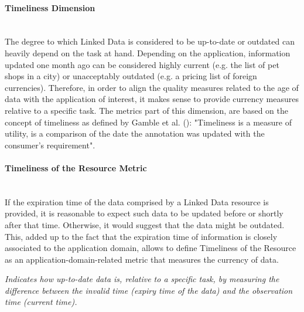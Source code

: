 

\paragraph{Timeliness Dimension}~\\ %
The degree to which Linked Data is considered to be up-to-date or outdated can heavily depend on the task at hand. Depending on the application, information updated one month ago can be considered highly current (e.g. the list of pet shops in a city) or unacceptably outdated (e.g. a pricing list of foreign currencies). Therefore, in order to align the quality measures related to the age of data with the application of interest, it makes sense to provide currency measures relative to a specific task. The metrics part of this dimension, are based on the concept of timeliness as defined by Gamble et al. (\cite{Gamble2011}): "Timeliness is a measure of utility, is a comparison of the date the annotation was updated with the consumer's requirement".

\paragraph{Timeliness of the Resource Metric} ~\\ %
If the expiration time of the data comprised by a Linked Data resource is provided, it is reasonable to expect such data to be updated before or shortly after that time. Otherwise, it would suggest that the data might be outdated. This, added up to the fact that the expiration time of information is closely associated to the application domain, allows to define Timeliness of the Resource as an application-domain-related metric that measures the currency of data.
\begin{mdframed}[style=metricdefinition]
\emph{Indicates how up-to-date data is, relative to a specific task, by measuring the difference between the invalid time (expiry time of the data) and the observation time (current time).}
\end{mdframed}

